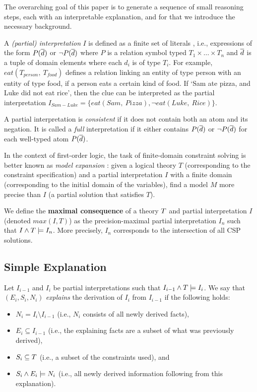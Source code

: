 The overarching goal of this paper is to generate a sequence of small reasoning steps, each with an interpretable explanation, and for that we introduce the necessary background.

A \emph{(partial) interpretation} $I$ is defined as a finite set of literals 
, i.e., expressions of the form 
$P(\overline{d})$ or $\lnot P(\overline{d})$ where $P$ is a relation symbol typed $T_1\times\dots \times T_n$ and $\overline{d}$ is a tuple of domain elements where each $d_i$ is of type $T_i$. For example, $eat(T_{person},\ T_{food})$ defines a relation linking an entity of type person with an entity of type food, if a person eats a certain kind of food.
If `Sam ate pizza, and Luke did not eat rice', then the clue can be interpreted as the partial interpretation $I_{Sam-Luke} = \{ eat(Sam,\ Pizza), \lnot eat(Luke,\ Rice)\}$.

A partial interpretation is \emph{consistent} if it does not contain both an atom and its negation.
It is called a \emph{full} interpretation if it either contains $P(\overline{d})$ or $\lnot P(\overline{d})$ for each well-typed atom $P(\overline{d})$.

In the context of first-order logic, the task of finite-domain constraint solving is better known as \emph{model expansion} \cite{MitchellTHM06}: given a logical theory $T$ (corresponding to the constraint specification) and a partial interpretation $I$ with a finite domain (corresponding to the initial domain of the variables), find a model $M$ more precise than $I$ (a partial solution that satisfies $T$).

We define the \textbf{maximal consequence} of a theory $T$ and partial interpretation $I$ (denoted $max(I,T)$) as the precision-maximal partial interpretation $I_n$ such that  $I \wedge T \models I_n$.
More precisely, $I_n$ corresponds to the intersection of all CSP solutions.

\subsection{Simple Explanation}

Let $I_{i-1}$ and $I_i$ be partial interpretations such that $I_{i-1}\land T \models I_i$.
We say that $(E_i,S_i,N_i)$ \emph{explains} the derivation of $I_{i}$ from $I_{i-1}$ if the following holds:
\begin{itemize}
   \item $N_i= I_i \setminus I_{i-1}$ (i.e., $N_i$ consists of all newly derived facts), 
   \item $E_i\subseteq I_{i-1}$ (i.e., the explaining facts are a subset of what was previously derived),
   \item $S_i \subseteq T$ (i.e., a subset of the constraints used), and 
   \item $S_i \land E_i \models N_i$ (i.e., all newly derived information following from this explanation).
\end{itemize}

